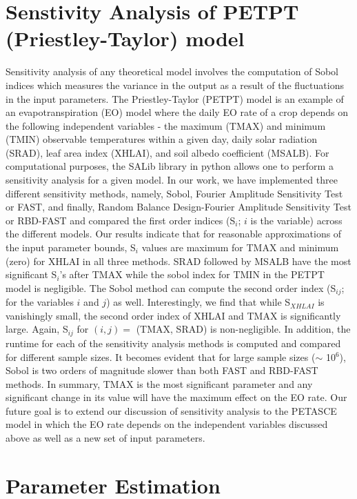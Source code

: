 \documentclass{article}
\begin{document}
\section{Senstivity Analysis of PETPT (Priestley-Taylor) model}

Sensitivity analysis of any theoretical model involves the computation of Sobol indices which measures the variance in the output as a
result of the fluctuations in the input parameters. 
The Priestley-Taylor (PETPT) model is an example of an
evapotranspiration (EO) model where the daily EO rate of a crop depends on the following independent
variables - the maximum (TMAX) and minimum (TMIN) observable temperatures within a
given day, daily solar radiation (SRAD), leaf area index (XHLAI), and soil
albedo coefficient (MSALB). For computational purposes, 
the SALib library in python allows one to perform a
sensitivity analysis for a given model. In our work, we have implemented three
different sensitivity methods, namely, Sobol, Fourier Amplitude Sensitivity Test or
FAST, and finally, Random Balance Design-Fourier Amplitude Sensitivity Test or
RBD-FAST and compared the first order indices (S$_i$; $i$ is the variable) across the different models.
Our results indicate that for reasonable approximations of the input parameter
bounds, S$_i$ values are maximum for TMAX and minimum (zero) for
XHLAI in all three methods. SRAD followed by MSALB have the most significant
S$_i$'s after TMAX while the sobol index for TMIN in the PETPT model is
negligible. The Sobol method can compute the second order index (S$_{ij}$; for
the variables $i$ and $j$) as
well. Interestingly, we find that while S$_{XHLAI}$ is vanishingly small,
the second order index of XHLAI and TMAX is significantly large. Again,
S$_{ij}$ for $(i, j)=$ (TMAX, SRAD) is non-negligible. In addition, the runtime for each of
the sensitivity analysis methods is computed and compared for different sample
sizes. It becomes evident that for large sample sizes ($\sim$ 10$^6$), Sobol is
two orders of magnitude slower than both FAST and RBD-FAST methods. In summary,
TMAX is the most significant parameter and any significant change in its value will
have the maximum effect on the EO rate. Our future goal is to extend our
discussion of sensitivity analysis to the PETASCE model in which the EO rate
depends on the
independent variables discussed above as well as a new set of input parameters.

\section{Parameter Estimation}
\end{document}
